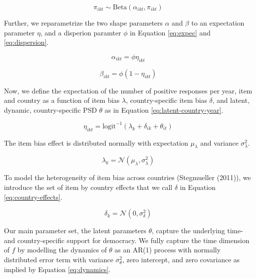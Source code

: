 \documentclass[12pt,english,a4paper,oneside]{article}
\theoremstyle{definition}
\theoremstyle{definition}
\theoremstyle{definition}
\theoremstyle{definition}
\theoremstyle{remark}
\begin{document}
\begin{equation}
\label{eq:prob-yes}
\pi_{ikt} \sim \text{Beta}(\alpha_{ikt}, \pi_{ikt})
\end{equation}

\noindent
Further, we reparametrize the two shape parameters \(\alpha\) and \(\beta\) to an expectation parameter \(\eta\), and a disperion paramter \(\phi\) in Equation \eqref{eq:expec} and \eqref{eq:dispersion}.

\begin{equation}
\label{eq:expec}
\alpha_{ikt} = \phi \eta_{ikt}
\end{equation}

\begin{equation}
\label{eq:dispersion}
\beta_{ikt} = \phi (1 - \eta_{ikt})
\end{equation}

\noindent
Now, we define the expectation of the number of positive responses per year, item and country as a function of item bias \(\lambda\), country-specific item bias \(\delta\), and latent, dynamic, country-specific PSD \(\theta\) as in Equation \eqref{eq:latent-country-year}.

\begin{equation}
\label{eq:latent-country-year}
\eta_{ikt} = \text{logit}^{-1}(\lambda_k + \delta_{ik} + \theta_{it})
\end{equation}

\noindent
The item bias effect is distributed normally with expectation \(\mu_{\lambda}\) and variance \(\sigma_{\lambda}^2\).

\begin{equation}
\label{eq:item-intercept}
\lambda_k = \mathcal{N}(\mu_{\lambda}, \sigma_{\lambda}^2)
\end{equation}

\noindent
To model the heterogeneity of item bias across countries (Stegmueller (2011)), we introduce the set of item by country effects that we call \(\delta\) in Equation \eqref{eq:country-effects}.

\begin{equation}
\label{eq:country-effects}
\delta_k = \mathcal{N}(0, \sigma_{\delta}^2)
\end{equation}

\noindent
Our main parameter set, the latent parameters \(\theta\), capture the underlying time- and country-specific support for democracy. We fully capture the time dimension of \(f\) by modelling the dynamics of \(\theta\) as an AR(1) process with normally distributed error term with variance \(\sigma_{\theta}^2\), zero intercept, and zero covariance as implied by Equation \eqref{eq:dynamics}.
\end{document}
